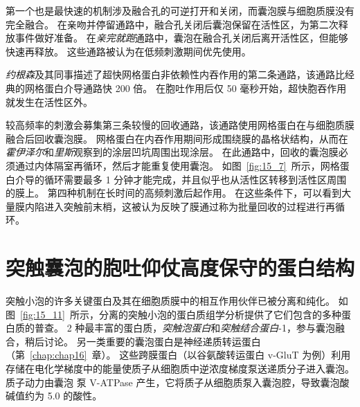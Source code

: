 第一个也是最快速的机制涉及融合孔的可逆打开和关闭，而囊泡膜与细胞质膜没有完全融合。
在亲吻并停留通路中，融合孔关闭后囊泡保留在活性区，为第二次释放事件做好准备。
在\textit{亲完就跑}通路中，囊泡在融合孔关闭后离开活性区，但能够快速再释放。
这些通路被认为在低频刺激期间优先使用。


\textit{约根森}及其同事描述了超快网格蛋白非依赖性内吞作用的第二条通路，该通路比经典的网格蛋白介导通路快 200 倍。
在胞吐作用后仅 50 毫秒开始，超快胞吞作用就发生在活性区外。


较高频率的刺激会募集第三条较慢的回收通路，该通路使用网格蛋白在与细胞质膜融合后回收囊泡膜。
网格蛋白在内吞作用期间形成围绕膜的晶格状结构，从而在\textit{霍伊泽尔}和\textit{里斯}观察到的涂层凹坑周围出现涂层。
在此通路中，回收的囊泡膜必须通过内体隔室再循环，然后才能重复使用囊泡。
如图~\ref{fig:15_7}~所示，网格蛋白介导的循环需要最多 1 分钟才能完成，并且似乎也从活性区转移到活性区周围的膜上。
第四种机制在长时间的高频刺激后起作用。
在这些条件下，可以看到大量膜内陷进入突触前末梢，这被认为反映了膜通过称为批量回收的过程进行再循环。



\section{突触囊泡的胞吐仰仗高度保守的蛋白结构}

突触小泡的许多关键蛋白及其在细胞质膜中的相互作用伙伴已被分离和纯化。
如图~\ref{fig:15_11}~所示，分离的突触小泡的蛋白质组学分析提供了它们包含的多种蛋白质的普查。
2 种最丰富的蛋白质，\textit{突触泡蛋白}和\textit{突触结合蛋白}-1，参与囊泡融合，稍后讨论。
另一类重要的囊泡蛋白是神经递质转运蛋白（第~\ref{chap:chap16}~章）。
这些跨膜蛋白（以谷氨酸转运蛋白 v-GluT 为例）利用存储在电化学梯度中的能量使质子从细胞质中逆浓度梯度泵送递质分子进入囊泡。
质子动力由囊泡  泵 V-ATPase 产生，它将质子从细胞质泵入囊泡腔，导致囊泡酸碱值约为 5.0 的酸性。


